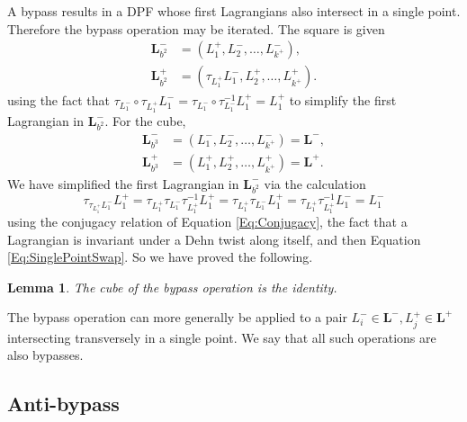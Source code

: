 \documentclass[11pt]{amsart}
\newcommand{\thicc}[1]{\pmb{#1}}
\newcommand{\LagTuple}{\thicc{L}}
\newtheorem{lemma}[thm]{Lemma}
\begin{document}
A bypass results in a DPF whose first Lagrangians also intersect in a single point. Therefore the bypass operation may be iterated. The square is given
\begin{equation*}
\begin{aligned}
\LagTuple_{b^{2}}^{-} &= (L^{+}_{1}, L^{-}_{2}, \dots, L^{-}_{k^{+}}),\\
\LagTuple_{b^{2}}^{+} &= (\tau_{L^{+}_{1}}L^{-}_{1}, L^{+}_{2}, \dots, L^{+}_{k^{+}}).
\end{aligned}
\end{equation*}
using the fact that $\tau_{L^{-}_{1}}\circ \tau_{L^{+}_{1}}L^{-}_{1} = \tau_{L^{-}_{1}}\circ \tau_{L^{-}_{1}}^{-1}L^{+}_{1} = L^{+}_{1}$ to simplify the first Lagrangian in $\LagTuple^{-}_{b^{2}}$. For the cube,
\begin{equation*}
\begin{aligned}
\LagTuple_{b^{3}}^{-} &= (L^{-}_{1}, L^{-}_{2}, \dots, L^{-}_{k^{+}}) = \LagTuple^{-},\\
\LagTuple_{b^{3}}^{+} &= (L^{+}_{1}, L^{+}_{2}, \dots, L^{+}_{k^{+}}) = \LagTuple^{+}.
\end{aligned}
\end{equation*}
We have simplified the first Lagrangian in $\LagTuple^{-}_{b^{2}}$ via the calculation
\begin{equation*}
\tau_{\tau_{L^{+}_{1}}L^{-}_{1}}L^{+}_{1} = \tau_{L^{+}_{1}}\tau_{L^{-}_{1}}\tau_{L^{+}_{1}}^{-1}L^{+}_{1} = \tau_{L^{+}_{1}}\tau_{L^{-}_{1}}L^{+}_{1} = \tau_{L^{+}_{1}}\tau_{L^{+}_{1}}^{-1}L^{-}_{1} = L^{-}_{1}
\end{equation*}
using the conjugacy relation of Equation \eqref{Eq:Conjugacy}, the fact that a Lagrangian is invariant under a Dehn twist along itself, and then Equation \eqref{Eq:SinglePointSwap}. So we have proved the following.

\begin{lemma}
The cube of the bypass operation is the identity.
\end{lemma}

The bypass operation can more generally be applied to a pair $L_{i}^{-} \in \LagTuple^{-}, L^{+}_{j} \in \LagTuple^{+}$ intersecting transversely in a single point. We say that all such operations are also bypasses.

\subsection{Anti-bypass}
\end{document}
